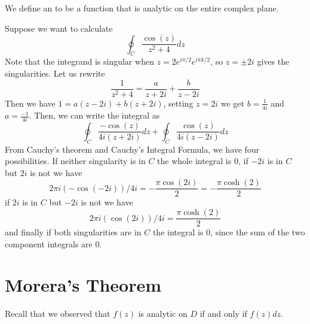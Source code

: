 \documentclass[12pt, a4paper, oneside, openright, titlepage]{book}
\begin{document}
\begin{defn}
    We define an  to be a function that is analytic on the entire complex plane.
\end{defn}


\begin{eg}
    Suppose we want to calculate \begin{equation*}
        \oint_C\frac{\cos(z)}{z^2+4}dz
    \end{equation*}
    Note that the integrand is singular when $z= 2e^{i \pi/2}e^{i\pi k/2}$, so $z = \pm 2i$ gives the singularities. Let us rewrite \begin{equation*}
        \frac{1}{z^2+4} = \frac{a}{z+2i}+\frac{b}{z-2i} 
    \end{equation*}
    Then we have $1 = a(z-2i)+b(z+2i)$, setting $z = 2i$ we get $b = \frac{1}{4i}$ and $a = \frac{-1}{4i}$. Then, we can write the integral as \begin{equation*}
        \oint_C\frac{-\cos(z)}{4i(z+2i)}dz + \oint_C\frac{\cos(z)}{4i(z-2i)}dz
    \end{equation*}
    From Cauchy's theorem and Cauchy's Integral Formula, we have four possibilities. If neither singularity is in $C$ the whole integral is $0$, if $-2i$ is in $C$ but $2i$ is not we have $$2\pi i(-\cos(-2i))/4i = -\frac{\pi\cos(2i)}{2} = -\frac{\pi\cosh(2)}{2}$$ if $2i$ is in $C$ but $-2i$ is not we have \begin{equation*}
        2\pi i(\cos(2i))/4i = \frac{\pi\cosh(2)}{2}
    \end{equation*}
    and finally if both singularities are in $C$ the integral is $0$, since the sum of the two component integrals are $0$.
\end{eg}


\section{Morera's Theorem}


Recall that we observed that $f(z)$ is analytic on $D$ if and only if $f(z)dz$.
\end{document}
